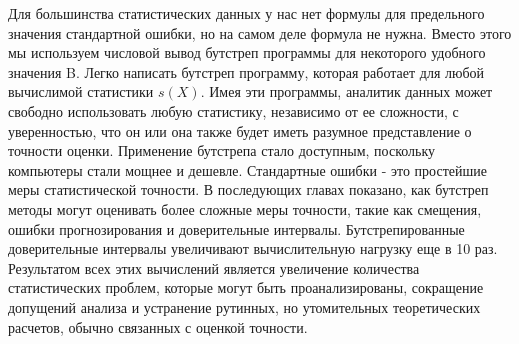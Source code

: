 Для большинства статистических данных у нас нет формулы для предельного значения стандартной ошибки, но на самом деле формула не нужна. Вместо этого мы используем числовой вывод бутстреп программы для некоторого удобного значения B. Легко написать бутстреп программу, которая работает для любой вычислимой статистики $s (X)$. Имея эти программы, аналитик данных может свободно использовать любую статистику, независимо от ее сложности, с уверенностью, что он или она также будет иметь разумное представление о точности оценки. Применение бутстрепа стало доступным, поскольку компьютеры стали мощнее и дешевле. 
Стандартные ошибки - это простейшие меры статистической точности. В последующих главах показано, как бутстреп методы могут оценивать более сложные меры точности, такие как смещения, ошибки прогнозирования и доверительные интервалы. Бутстрепированные доверительные интервалы увеличивают вычислительную нагрузку еще в 10 раз. Результатом всех этих вычислений является увеличение количества статистических проблем, которые могут быть проанализированы, сокращение допущений анализа и устранение рутинных, но утомительных теоретических расчетов, обычно связанных с оценкой точности. 
